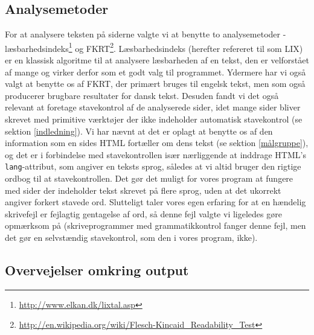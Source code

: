 \documentclass[a4paper,oneside,article]{memoir}
\begin{document}
\subsection{Analysemetoder}
\label{analysemetoder}
For at analysere teksten på siderne valgte vi at benytte to
analysemetoder -
læsbarhedsindeks\footnote{\url{http://www.elkan.dk/lixtal.asp}} og
FKRT\footnote{\url{http://en.wikipedia.org/wiki/Flesch-Kincaid_Readability_Test}}.
Læsbarhedsindeks (herefter refereret til som LIX) er en klassisk
algoritme til at analysere læsbarheden af en tekst, den er velforstået
af mange og virker derfor som et godt valg til programmet. Ydermere
har vi også valgt at benytte os af FKRT, der primært bruges til
engelsk tekst, men som også producerer brugbare resultater for dansk
tekst. Desuden fandt vi det også relevant at foretage stavekontrol af
de analyserede sider, idet mange sider bliver skrevet med primitive
værktøjer der ikke indeholder automatisk stavekontrol (se sektion
\ref{indledning}). Vi har nævnt at det er oplagt at benytte os af den
information som en sides HTML fortæller om dens tekst (se sektion
\ref{målgruppe}), og det er i forbindelse med stavekontrollen især
nærliggende at inddrage HTML's \texttt{lang}-attribut, som angiver en
teksts sprog, således at vi altid bruger den rigtige ordbog til at
stavekontrollen. Det gør det muligt for vores program at fungere med
sider der indeholder tekst skrevet på flere sprog, uden at det
ukorrekt angiver forkert stavede ord. Slutteligt taler vores egen
erfaring for at en hændelig skrivefejl er fejlagtig gentagelse af ord,
så denne fejl valgte vi ligeledes gøre opmærksom på (skriveprogrammer
med grammatikkontrol fanger denne fejl, men det gør en selvstændig
stavekontrol, som den i vores program, ikke).

\subsection{Overvejelser omkring output}
\end{document}
